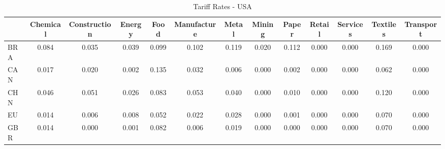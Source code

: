 \begin{table}[htbp]
\centering
\caption{Tariff Rates - USA} 
\label{tab:tariff_USA}
\begin{tabular}{lcccccccccccc}
  \hline
 & Chemical & Construction & Energy & Food & Manufacture & Metal & Mining & Paper & Retail & Services & Textiles & Transport \\ 
  \hline
BRA & \textcolor[RGB]{25,16,230}{0.084} & \textcolor[RGB]{62,40,193}{0.035} & \textcolor[RGB]{57,37,198}{0.039} & \textcolor[RGB]{21,14,234}{0.099} & \textcolor[RGB]{17,11,238}{0.102} & \textcolor[RGB]{13,8,242}{0.119} & \textcolor[RGB]{83,54,172}{0.020} & \textcolor[RGB]{15,10,240}{0.112} & \textcolor[RGB]{255,165,0}{0.000} & \textcolor[RGB]{255,165,0}{0.000} & \textcolor[RGB]{6,4,249}{0.169} & \textcolor[RGB]{255,165,0}{0.000} \\ 
  CAN & \textcolor[RGB]{91,59,164}{0.017} & \textcolor[RGB]{85,55,170}{0.020} & \textcolor[RGB]{125,81,130}{0.002} & \textcolor[RGB]{8,5,246}{0.135} & \textcolor[RGB]{64,41,191}{0.032} & \textcolor[RGB]{117,76,138}{0.006} & \textcolor[RGB]{255,165,0}{0.000} & \textcolor[RGB]{123,80,132}{0.002} & \textcolor[RGB]{255,165,0}{0.000} & \textcolor[RGB]{255,165,0}{0.000} & \textcolor[RGB]{40,26,215}{0.062} & \textcolor[RGB]{255,165,0}{0.000} \\ 
  CHN & \textcolor[RGB]{53,34,202}{0.046} & \textcolor[RGB]{49,32,206}{0.051} & \textcolor[RGB]{72,47,183}{0.026} & \textcolor[RGB]{28,18,227}{0.083} & \textcolor[RGB]{42,27,212}{0.053} & \textcolor[RGB]{55,36,200}{0.040} & \textcolor[RGB]{255,165,0}{0.000} & \textcolor[RGB]{102,66,153}{0.010} & \textcolor[RGB]{255,165,0}{0.000} & \textcolor[RGB]{255,165,0}{0.000} & \textcolor[RGB]{11,7,244}{0.120} & \textcolor[RGB]{255,165,0}{0.000} \\ 
  EU & \textcolor[RGB]{96,62,159}{0.014} & \textcolor[RGB]{113,73,142}{0.006} & \textcolor[RGB]{108,70,147}{0.008} & \textcolor[RGB]{45,29,210}{0.052} & \textcolor[RGB]{77,50,178}{0.022} & \textcolor[RGB]{70,45,185}{0.028} & \textcolor[RGB]{255,165,0}{0.000} & \textcolor[RGB]{130,84,125}{0.001} & \textcolor[RGB]{255,165,0}{0.000} & \textcolor[RGB]{255,165,0}{0.000} & \textcolor[RGB]{38,25,217}{0.070} & \textcolor[RGB]{255,165,0}{0.000} \\ 
  GBR & \textcolor[RGB]{98,63,157}{0.014} & \textcolor[RGB]{255,165,0}{0.000} & \textcolor[RGB]{128,82,128}{0.001} & \textcolor[RGB]{30,19,225}{0.082} & \textcolor[RGB]{113,73,142}{0.006} & \textcolor[RGB]{87,56,168}{0.019} & \textcolor[RGB]{255,165,0}{0.000} & \textcolor[RGB]{255,165,0}{0.000} & \textcolor[RGB]{255,165,0}{0.000} & \textcolor[RGB]{255,165,0}{0.000} & \textcolor[RGB]{36,23,219}{0.070} & \textcolor[RGB]{255,165,0}{0.000} \\ 

\end{tabular}
\end{table}
